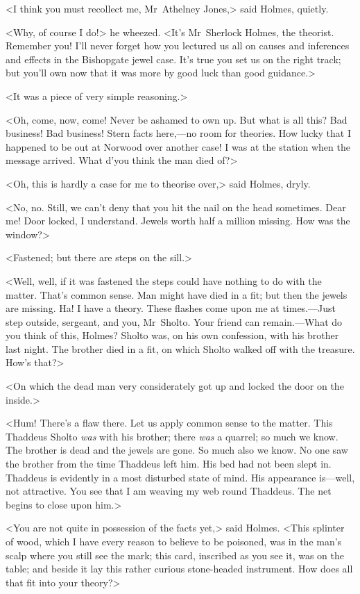 <I think you must recollect me, Mr~Athelney Jones,> said Holmes, quietly.

<Why, of course I do!> he wheezed. <It's Mr~Sherlock Holmes, the theorist. Remember you! I'll never forget how you lectured us all on causes and inferences and effects in the Bishopgate jewel case. It's true you set us on the right track; but you'll own now that it was more by good luck than good guidance.>

<It was a piece of very simple reasoning.>

<Oh, come, now, come! Never be ashamed to own up. But what is all this? Bad business! Bad business! Stern facts here,—no room for theories. How lucky that I happened to be out at Norwood over another case! I was at the station when the message arrived. What d'you think the man died of?>

<Oh, this is hardly a case for me to theorise over,> said Holmes, dryly.

<No, no. Still, we can't deny that you hit the nail on the head sometimes. Dear me! Door locked, I understand. Jewels worth half a million missing. How was the window?>

<Fastened; but there are steps on the sill.>

<Well, well, if it was fastened the steps could have nothing to do with the matter. That's common sense. Man might have died in a fit; but then the jewels are missing. Ha! I have a theory. These flashes come upon me at times.—Just step outside, sergeant, and you, Mr~Sholto. Your friend can remain.—What do you think of this, Holmes? Sholto was, on his own confession, with his brother last night. The brother died in a fit, on which Sholto walked off with the treasure. How's that?>

<On which the dead man very considerately got up and locked the door on the inside.>

<Hum! There's a flaw there. Let us apply common sense to the matter. This Thaddeus Sholto \textit{was} with his brother; there \textit{was} a quarrel; so much we know. The brother is dead and the jewels are gone. So much also we know. No one saw the brother from the time Thaddeus left him. His bed had not been slept in. Thaddeus is evidently in a most disturbed state of mind. His appearance is—well, not attractive. You see that I am weaving my web round Thaddeus. The net begins to close upon him.>

<You are not quite in possession of the facts yet,> said Holmes. <This splinter of wood, which I have every reason to believe to be poisoned, was in the man's scalp where you still see the mark; this card, inscribed as you see it, was on the table; and beside it lay this rather curious stone-headed instrument. How does all that fit into your theory?>

